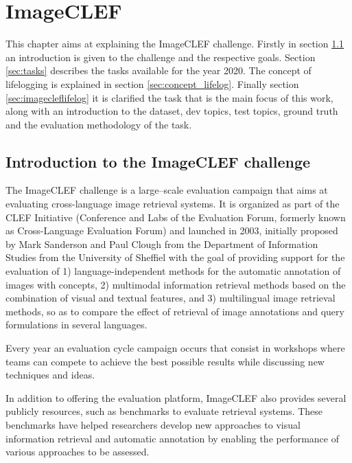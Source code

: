 \cleardoublepage

\chapter{ImageCLEF}
\label{ch:imageclef}

This chapter aims at explaining the ImageCLEF challenge. Firstly in section \ref{sec:introduct} an introduction is given to the challenge and the respective goals. Section \ref{sec:tasks} describes the tasks available for the year 2020. The concept of lifelogging is explained in section \ref{sec:concept_lifelog}. Finally section \ref{sec:imagecleflifelog} it is clarified the task that is the main focus of this work, along with an introduction to the dataset, dev topics, test topics, ground truth and the evaluation methodology of the task.



\section{Introduction to the ImageCLEF challenge}
\label{sec:introduct}

The ImageCLEF challenge is a large–scale evaluation campaign that aims at evaluating cross-language image retrieval systems. It is organized as part of the CLEF Initiative (Conference and Labs of the Evaluation Forum, formerly known as Cross-Language Evaluation Forum) and launched in  2003, initially proposed by Mark Sanderson and Paul Clough from the Department of Information Studies from the University of Sheffiel with the goal of providing support for the evaluation of 1) language-independent methods for the automatic annotation of images with concepts, 2) multimodal information retrieval methods based on the combination of visual and textual features, and 3) multilingual image retrieval methods, so as to compare the effect of retrieval of image annotations and query formulations in several languages.


Every year an evaluation cycle campaign occurs that consist in workshops where teams can compete to achieve the best possible results while discussing new techniques and ideas. 

In addition to offering the evaluation platform, ImageCLEF also provides several publicly resources, such as benchmarks to evaluate retrieval systems. These benchmarks have helped researchers develop new approaches to visual information retrieval and automatic annotation by enabling the performance of various approaches to be assessed.

